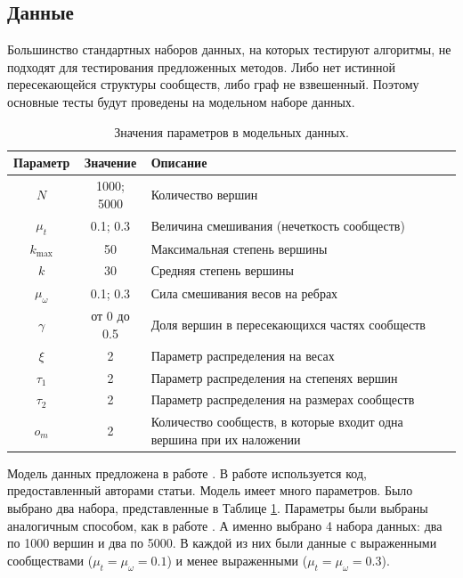 \documentclass{ITaSconf}
\begin{document}
	\subsection{Данные}
	Большинство стандартных наборов данных, на которых тестируют алгоритмы, не подходят для тестирования предложенных методов.
	Либо нет истинной пересекающейся структуры сообществ, либо граф не взвешенный. 
	Поэтому основные тесты будут проведены на модельном наборе данных.
	\begin{center}
		\begin{table}[!th]
			\centering
			\begin{tabular}{ c c l }
				\hline
				\hline
				\textbf{Параметр} & \textbf{Значение} & \textbf{Описание} \\
				\hline
				$N$				& 1000; 5000 	& Количество вершин	\\[2px]
				$\mu_t$			& 0.1; 0.3 		& Величина смешивания (нечеткость сообществ)\\[2px]
				$k_{\max}$		& 50 			& Максимальная степень вершины\\[2px]
				$k$				& 30	 		& Средняя степень вершины\\[2px]
				$\mu_{\omega}$	& 0.1; 0.3 		& Сила смешивания весов на ребрах\\[2px]
				$\gamma$		& от 0 до 0.5 	& Доля вершин в пересекающихся частях сообществ\\[2px]
				$\xi$			& 2 			& Параметр распределения на весах\\[2px]
				$\tau_1$		& 2 			& Параметр распределения на степенях вершин\\[2px]
				$\tau_2$		& 2 			& Параметр распределения на размерах сообществ\\[2px]
				$o_m$			& 2 			& Количество сообществ, в которые входит одна вершина при их наложении \\
				\hline
				\hline
			\end{tabular}
			\centering
			\caption{Значения параметров в модельных данных. }
			\label{table:bench_params}
		\end{table}
	\end{center}
	Модель данных предложена в работе \cite{lancichinetti2009benchmarks}. 
	В работе используется код, предоставленный авторами статьи. 
	Модель имеет много параметров. 
	Было выбрано два набора, представленные в Таблице \ref{table:bench_params}. 
	Параметры были выбраны аналогичным способом, как в работе \cite{lu2015algorithms}. А именно выбрано 4 набора данных: два по 1000 вершин и два по 5000. В каждой из них были данные с выраженными сообществами ($\mu_t=\mu_{\omega}=0.1$) и менее выраженными ($\mu_t=\mu_{\omega}=0.3$).
	
\end{document}

